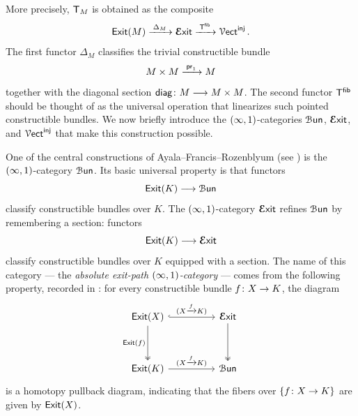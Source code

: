 More precisely, $\mathsf T_M$ is obtained as the composite
\begin{equation}
    \operatorname{\sf Exit}(M) \xrightarrow{\;\Delta_M\;} \operatorname{\boldsymbol{\mathcal E}{\sf xit}} \xrightarrow{\;\mathsf T^{\sf fib}\;} \operatorname{\mathcal V{\sf ect}}^{\operatorname{\mathsf{inj}}}.
\end{equation}
The first functor $\Delta_M$ classifies the trivial constructible bundle
\begin{equation}
    M\times M \xrightarrow{\;\mathsf{pr}_1\;} M
\end{equation}
together with the diagonal section $\mathsf{diag}\colon M \longrightarrow M\times M$. The second functor $\mathsf T^{\sf fib}$ should be thought of as the universal operation that linearizes such pointed constructible bundles. We now briefly introduce the $(\operatorname{\infty},1)$-categories $\operatorname{\mathcal B\mathsf{un}}$, $\operatorname{\boldsymbol{\mathcal E}{\sf xit}}$, and $\operatorname{\mathcal V{\sf ect}}^{\operatorname{\mathsf{inj}}}$ that make this construction possible.

\begin{intuition}
One of the central constructions of Ayala--Francis--Rozenblyum (see \cite{AFR2}) is the $(\operatorname{\infty},1)$-category $\operatorname{\mathcal B\mathsf{un}}$. Its basic universal property is that functors 
\begin{equation}
    \operatorname{\sf Exit}(K) \longrightarrow \operatorname{\mathcal B\mathsf{un}}
\end{equation}
classify constructible bundles over $K$. The $(\operatorname{\infty},1)$-category $\operatorname{\boldsymbol{\mathcal E}{\sf xit}}$ refines $\operatorname{\mathcal B\mathsf{un}}$ by remembering a section: functors
\begin{equation}
    \operatorname{\sf Exit}(K) \longrightarrow \operatorname{\boldsymbol{\mathcal E}{\sf xit}}
\end{equation}
classify constructible bundles over $K$ equipped with a section. The name of this category — the \emph{absolute exit-path $(\operatorname{\infty},1)$-category} — comes from the following property, recorded in \cite[Proposition~6.4.3]{AFR1}: for every constructible bundle $f\colon X \rightarrow K$, the diagram
\begin{equation}
        \begin{tikzcd}[ampersand replacement=\&]
            \exit(X) \&\& \Exit \\
            \\
            \exit(K) \&\& {\Bun}
            \arrow["{(X \xra{f} K)}", hook, from=1-1, to=1-3]
            \arrow["\exit(f)"', two heads, from=1-1, to=3-1]
            \arrow[two heads, from=1-3, to=3-3]
            \arrow["(X \xra{f} K)", from=3-1, to=3-3]
        \end{tikzcd}
\end{equation} 
is a homotopy pullback diagram, indicating that the fibers over $\{f\colon X \rightarrow K\}$ are given by $\operatorname{\sf Exit}(X)$. 
\end{intuition}


